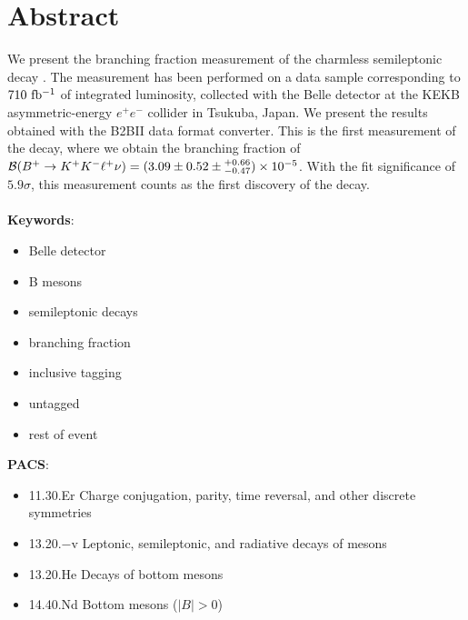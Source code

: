 \chapter*{Abstract}
We present the branching fraction measurement of the charmless semileptonic decay \decayb. The measurement has been performed on a data sample corresponding to $710\mathrm{~fb^{-1}}$ of integrated luminosity, collected with the Belle detector at the KEKB asymmetric-energy $e^+e^-$ collider in Tsukuba, Japan. We present the results obtained with the B2BII data format converter. This is the first measurement of the decay, where we obtain the branching fraction of $\mathcal{B}(B^+ \to K^+ K^- \ell^+ \nu) = (3.09 \pm 0.52 \pm {}^{+0.66}_{-0.47})\times 10^{-5}$. With the fit significance of $5.9\sigma$, this measurement counts as the first discovery of the decay.\\
\vspace{1cm}\\
{{\bf Keywords}:} 
\begin{itemize}
	\item Belle detector
	\item B mesons
	\item semileptonic decays
	\item branching fraction
	\item inclusive tagging
	\item untagged
	\item rest of event
\end{itemize}
\vspace{1cm}
{{\bf PACS}:}
\begin{itemize}
	\item 11.30.Er Charge conjugation, parity, time reversal, and other discrete symmetries
	\item 13.20.−v Leptonic, semileptonic, and radiative decays of mesons
	\item 13.20.He Decays of bottom mesons 
	\item 14.40.Nd Bottom mesons ($|B|>0$) 
\end{itemize}

\pagestyle{empty}

\tableofcontents
\pagestyle{plain}
